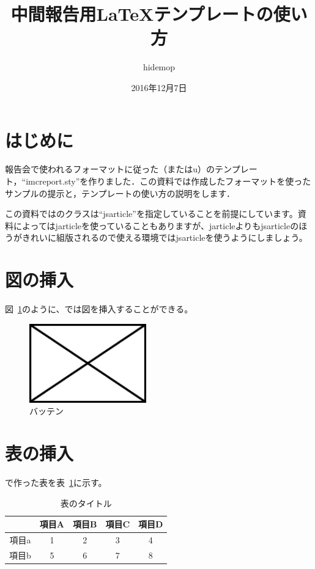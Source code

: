 \documentclass[10pt, a4j, uplatex, dvipdfmx, twocolumn]{jsarticle}
\title{中間報告用\LaTeX テンプレートの使い方}   %
\author{hidemop}                                %
\date{2016年12月7日}                            %
\begin{document}
\maketitle

\section{はじめに}

報告会で使われるフォーマットに従った\pLaTeX（またはu\pLaTeX）のテンプレート，``imcreport.sty''を作りました．この資料では作成したフォーマットを使ったサンプルの提示と，テンプレートの使い方の説明をします．

この資料では\pLaTeX のクラスは``jsarticle''を指定していることを前提にしています。資料によってはjarticleを使っていることもありますが、jarticleよりもjsarticleのほうがきれいに組版されるので使える環境ではjsarticleを使うようにしましょう。

\section{図の挿入}

図~\ref{バッテンのラベル}のように、\pLaTeX では図を挿入することができる。
\begin{figure}[bp]
  \centering
  \includegraphics[width=0.45\textwidth]{./sample_figure.pdf}
  \caption{バッテン}
  \label{バッテンのラベル}
\end{figure}

\section{表の挿入}

\pLaTeX で作った表を表~\ref{表のラベル}に示す。
\begin{table}[bp]
  \centering
  \caption{表のタイトル}
  \label{表のラベル}
  \begin{tabular}{c|cccc}
    \hline
          & 項目A & 項目B & 項目C & 項目D \\
    \hline \hline
    項目a & 1     & 2     & 3     & 4 \\
    項目b & 5     & 6     & 7     & 8 \\
    \hline
  \end{tabular}
\end{table}
\end{document}
